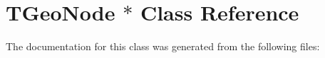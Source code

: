 \hypertarget{class_t_geo_node_01_5}{}\section{T\+Geo\+Node $\ast$ Class Reference}
\label{class_t_geo_node_01_5}


The documentation for this class was generated from the following files\+: